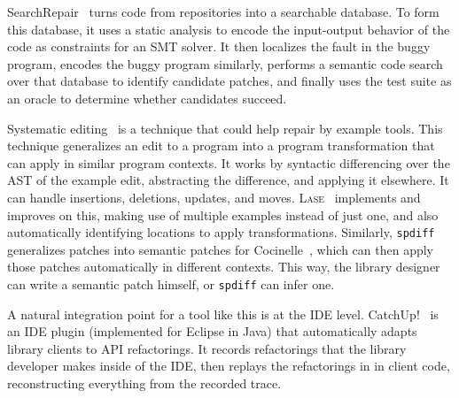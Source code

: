 SearchRepair~\cite{Ke:2015:RPS:2916135.2916260} turns code from repositories into a searchable database.
To form this database, it uses a static analysis to encode the input-output behavior of the code as constraints for an SMT solver.
It then localizes the fault in the buggy program,
encodes the buggy program similarly, performs a semantic code search over that database to identify candidate patches,
and finally uses the test suite as an oracle to determine whether candidates succeed. %

Systematic editing~\cite{meng2011systematic} is a technique that could help repair by example tools.
This technique generalizes an edit to a program into a program transformation that can apply in similar program contexts.
It works by syntactic differencing over the AST of the example edit, abstracting the difference, and applying it elsewhere.
It can handle insertions, deletions, updates, and moves.
\textsc{Lase}~\cite{meng2013lase} implements and improves on this,
making use of multiple examples instead of just one, %
and also automatically identifying locations to apply transformations.
Similarly, \lstinline{spdiff}~\cite{andersen2010generic} generalizes patches into semantic patches for Cocinelle~\cite{padioleau2008documenting},
which can then apply those patches automatically in different contexts. This way, the library designer can write a semantic patch
himself, or \lstinline{spdiff} can infer one.

A natural integration point for a tool like this is at the IDE level. %
CatchUp!~\cite{Henkel:2005:CCR:1062455.1062512} is an IDE plugin (implemented for Eclipse in Java) that automatically adapts library clients to API refactorings.
It records refactorings that the library developer makes inside of the IDE,
then replays the refactorings in in client code, reconstructing everything from the recorded trace. %



